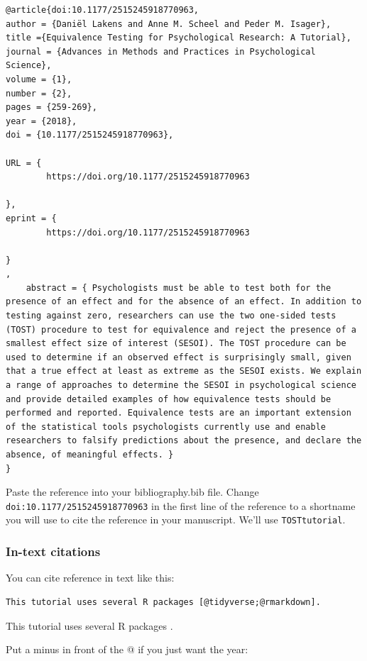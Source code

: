 \documentclass[
  oneside]{book}
\begin{document}
\begin{verbatim}
@article{doi:10.1177/2515245918770963,
author = {Daniël Lakens and Anne M. Scheel and Peder M. Isager},
title ={Equivalence Testing for Psychological Research: A Tutorial},
journal = {Advances in Methods and Practices in Psychological Science},
volume = {1},
number = {2},
pages = {259-269},
year = {2018},
doi = {10.1177/2515245918770963},

URL = { 
        https://doi.org/10.1177/2515245918770963
    
},
eprint = { 
        https://doi.org/10.1177/2515245918770963
    
}
,
    abstract = { Psychologists must be able to test both for the presence of an effect and for the absence of an effect. In addition to testing against zero, researchers can use the two one-sided tests (TOST) procedure to test for equivalence and reject the presence of a smallest effect size of interest (SESOI). The TOST procedure can be used to determine if an observed effect is surprisingly small, given that a true effect at least as extreme as the SESOI exists. We explain a range of approaches to determine the SESOI in psychological science and provide detailed examples of how equivalence tests should be performed and reported. Equivalence tests are an important extension of the statistical tools psychologists currently use and enable researchers to falsify predictions about the presence, and declare the absence, of meaningful effects. }
}
\end{verbatim}

Paste the reference into your bibliography.bib file. Change \texttt{doi:10.1177/2515245918770963} in the first line of the reference to a shortname you will use to cite the reference in your manuscript. We'll use \texttt{TOSTtutorial}.

\hypertarget{in-text-citations}{%
\subsubsection{In-text citations}\label{in-text-citations}}

You can cite reference in text like this:

\begin{verbatim}
This tutorial uses several R packages [@tidyverse;@rmarkdown].
\end{verbatim}

This tutorial uses several R packages \citep{tidyverse, rmarkdown}.

Put a minus in front of the @ if you just want the year:
\end{document}
